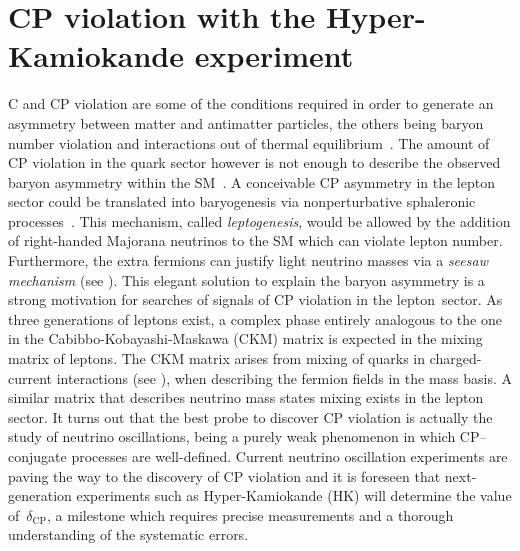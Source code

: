 
\clearpage
\chapter[CP violation with HK]{CP violation with the Hyper-Kamiokande experiment}
\label{cha:cp_hk}


C and CP violation are some of the conditions required in order to generate %
an asymmetry between matter and antimatter particles, the others being %
baryon number violation and interactions out of thermal equilibrium~\cite{Sakharov:1967dj}.
The amount of CP violation in the quark sector however is not enough %
to describe the observed baryon asymmetry within the SM~\cite{Farrar:1993hn}.
A conceivable CP asymmetry in the lepton sector could be translated into baryogenesis %
via nonperturbative sphaleronic processes~\cite{Fukugita:1986hr}.
This mechanism, called \emph{leptogenesis}, would be allowed by the addition of %
right-handed Majorana neutrinos to the SM which can violate lepton number.
Furthermore, the extra fermions can justify light neutrino masses via a \emph{seesaw mechanism} (see ).
This elegant solution to explain the baryon asymmetry is a strong motivation %
for searches of signals of CP violation in the lepton~sector.
As three generations of leptons exist, a complex phase entirely analogous to the one %
in the Cabibbo-Kobayashi-Maskawa (CKM) matrix is expected in the mixing matrix of leptons.
The CKM matrix arises from mixing of quarks in charged-current interactions (see ), %
when describing the fermion fields in the mass basis.
A similar matrix that describes neutrino mass states mixing exists in the lepton sector.
It turns out that the best probe to discover CP violation is actually the study of neutrino oscillations, %
being a purely weak phenomenon in which CP--conjugate processes are well-defined.
Current neutrino oscillation experiments are paving the way to the discovery of CP violation %
and it is foreseen that next-generation experiments such as Hyper-Kamiokande (HK) %
will determine the value of~$\delta_\text{CP}$, a milestone which requires precise measurements %
and a thorough understanding of the systematic errors.

